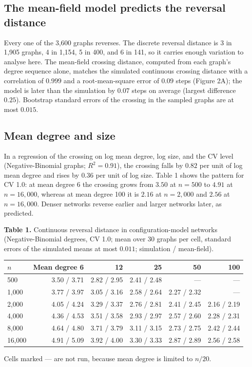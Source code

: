 \documentclass{nws}
\begin{document}
\subsection{The mean-field model predicts the reversal distance}

Every one of the 3{,}600 graphs reverses. The discrete reversal distance is 3 in
1{,}905 graphs, 4 in 1{,}154, 5 in 400, and 6 in 141, so it carries enough
variation to analyse here. The mean-field crossing distance, computed from each
graph's degree sequence alone, matches the simulated continuous crossing distance
with a correlation of $0.999$ and a root-mean-square error of $0.09$ steps
(Figure 2A); the model is later than the simulation by $0.07$ steps on average
(largest difference $0.25$). Bootstrap standard errors of the crossing in the
sampled graphs are at most $0.015$.

\subsection{Mean degree and size}

In a regression of the crossing on log mean degree, log size, and the CV level (Negative-Binomial graphs; $R^2=0.91$), the crossing falls by
$0.82$ per unit of log mean degree and rises by $0.36$ per unit of log size. Table 1 shows the pattern for CV 1.0:
at mean degree 6 the crossing grows from $3.50$ at $n=500$ to $4.91$ at
$n=16{,}000$, whereas at mean degree 100 it is $2.16$ at $n=2{,}000$ and $2.56$ at
$n=16{,}000$. Denser networks reverse earlier and larger networks later, as
predicted.

\begin{table}[t]
\centering
\textbf{Table 1.} Continuous reversal distance in configuration-model networks
(Negative-Binomial degrees, CV 1.0; mean over 30 graphs per cell, standard errors of the simulated means at most $0.011$; simulation / mean-field).

\vspace{4pt}
{\small\sf\sansmath
\begin{tabular}{lrrrrr}
\toprule
$n$ & Mean degree 6 & 12 & 25 & 50 & 100\\
\midrule
500 & 3.50 / 3.71 & 2.82 / 2.95 & 2.41 / 2.48 & --- & ---\\
1{,}000 & 3.77 / 3.97 & 3.05 / 3.16 & 2.58 / 2.64 & 2.27 / 2.32 & ---\\
2{,}000 & 4.05 / 4.24 & 3.29 / 3.37 & 2.76 / 2.81 & 2.41 / 2.45 & 2.16 / 2.19\\
4{,}000 & 4.36 / 4.53 & 3.51 / 3.58 & 2.93 / 2.97 & 2.57 / 2.60 & 2.28 / 2.31\\
8{,}000 & 4.64 / 4.80 & 3.71 / 3.79 & 3.11 / 3.15 & 2.73 / 2.75 & 2.42 / 2.44\\
16{,}000 & 4.91 / 5.09 & 3.92 / 4.00 & 3.30 / 3.33 & 2.87 / 2.89 & 2.56 / 2.58\\
\bottomrule
\end{tabular}
\par}

\vspace{4pt}
{\small Cells marked --- are not run, because mean degree is limited to $n/20$.}
\end{table}
\end{document}
